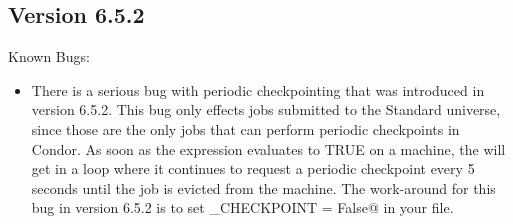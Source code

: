 \subsection{\label{sec:New-6-5-2}Version 6.5.2}

\noindent Known Bugs:
\begin{itemize}

\item There is a serious bug with periodic checkpointing that was
  introduced in version 6.5.2.
  This bug only effects jobs submitted to the Standard universe, since
  those are the only jobs that can perform periodic checkpoints in
  Condor. 
  As soon as the  expression evaluates to
  TRUE on a machine, the  will get in a loop where it
  continues to request a periodic checkpoint every 5 seconds until the
  job is evicted from the machine.
  The work-around for this bug in version 6.5.2 is to set
  \verb@PERIODIC_CHECKPOINT = False@ in your 
  file.

\end{itemize}

